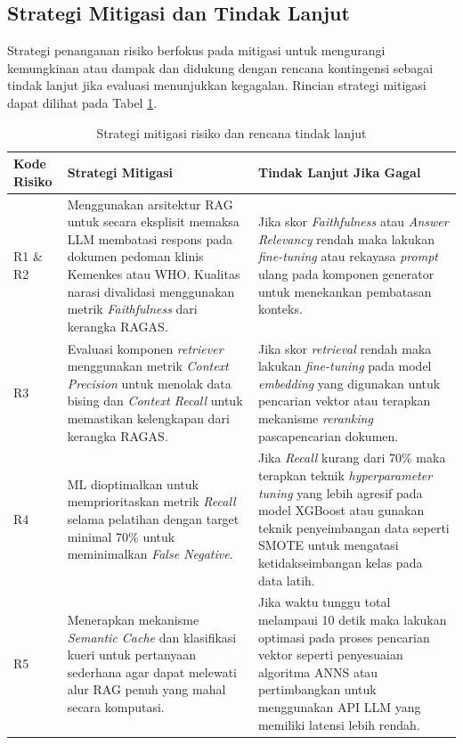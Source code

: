 \subsection{Strategi Mitigasi dan Tindak Lanjut}
Strategi penanganan risiko berfokus pada mitigasi untuk mengurangi kemungkinan atau dampak dan didukung dengan rencana kontingensi sebagai tindak lanjut jika evaluasi menunjukkan kegagalan. Rincian strategi mitigasi dapat dilihat pada Tabel \ref{tab:mitigasi-risiko}.

\begin{table}[htbp]
    \caption{Strategi mitigasi risiko dan rencana tindak lanjut}
    \label{tab:mitigasi-risiko}
    \centering
    \small
    \begin{tabular}{|p{2cm}|p{5.5cm}|p{5.5cm}|}
        \hline
        \textbf{Kode Risiko} & \textbf{Strategi Mitigasi} & \textbf{Tindak Lanjut Jika Gagal} \\
        \hline
        R1 \& R2 & Menggunakan arsitektur RAG untuk secara eksplisit memaksa LLM membatasi respons pada dokumen pedoman klinis Kemenkes atau WHO. Kualitas narasi divalidasi menggunakan metrik \textit{Faithfulness} dari kerangka RAGAS. & Jika skor \textit{Faithfulness} atau \textit{Answer Relevancy} rendah maka lakukan \textit{fine-tuning} atau rekayasa \textit{prompt} ulang pada komponen generator untuk menekankan pembatasan konteks. \\
        \hline
        R3 & Evaluasi komponen \textit{retriever} menggunakan metrik \textit{Context Precision} untuk menolak data bising dan \textit{Context Recall} untuk memastikan kelengkapan dari kerangka RAGAS. & Jika skor \textit{retrieval} rendah maka lakukan \textit{fine-tuning} pada model \textit{embedding} yang digunakan untuk pencarian vektor atau terapkan mekanisme \textit{reranking} pascapencarian dokumen. \\
        \hline
        R4 & ML dioptimalkan untuk memprioritaskan metrik \textit{Recall} selama pelatihan dengan target minimal 70\% untuk meminimalkan \textit{False Negative}. & Jika \textit{Recall} kurang dari 70\% maka terapkan teknik \textit{hyperparameter tuning} yang lebih agresif pada model XGBoost atau gunakan teknik penyeimbangan data seperti SMOTE untuk mengatasi ketidakseimbangan kelas pada data latih. \\
        \hline
        R5 & Menerapkan mekanisme \textit{Semantic Cache} dan klasifikasi kueri untuk pertanyaan sederhana agar dapat melewati alur RAG penuh yang mahal secara komputasi. & Jika waktu tunggu total melampaui 10 detik maka lakukan optimasi pada proses pencarian vektor seperti penyesuaian algoritma ANNS atau pertimbangkan untuk menggunakan API LLM yang memiliki latensi lebih rendah. \\
        \hline
    \end{tabular}
\end{table}